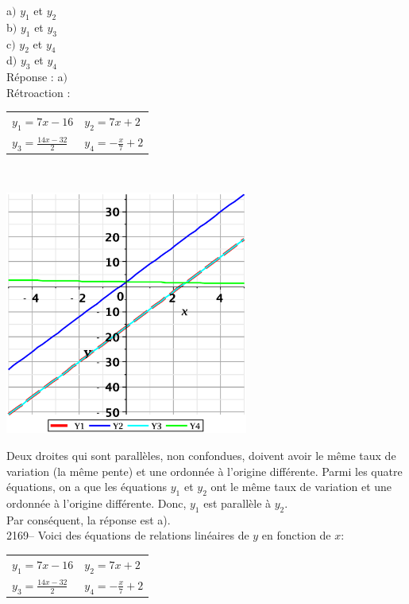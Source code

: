 \documentclass[letterpaper, 12pt]{article}
\begin{document}
a$)$ $ y_{1}$ et $ y_{2}$\\
b$)$ $ y_{1}$ et $ y_{3}$\\
c$)$ $ y_{2}$ et $ y_{4}$\\
d$)$ $ y_{3}$ et $ y_{4}$\\

R\'eponse : a$)$\\

R\'etroaction :
\begin{center}
\begin{tabular}{l l}
 $ y_{1}=7x-16 $ &  $ y_{2}=7x+2 $ \\
 $ y_{3}=\frac{14x-32}{2} $ &  $ y_{4}=-\frac{x}{7}+2 $ \\
\end{tabular}\\
\end{center}
\begin{center}
 \includegraphics[width=8cm,bb=20 118 575 673]{Q2168.eps}
\end{center}
Deux droites qui sont parall\`eles, non confondues, doivent avoir le m\^eme taux de variation (la m\^eme pente) et une ordonn\'ee \`a l'origine diff\'erente. Parmi les quatre \'equations, on a que les \'equations $ y_{1}$ et $ y_{2}$ ont le m\^eme taux de variation et une ordonn\'ee \`a l'origine diff\'erente. Donc, $ y_{1}$ est parall\`ele \`a $ y_{2}$.\\
Par cons\'equent, la r\'eponse est a).\\

2169-- Voici des \'equations de relations lin\'eaires de $y$ en fonction de $x$:
\begin{center}
\begin{tabular}{l l}
 $ y_{1}=7x-16 $ &  $ y_{2}=7x+2 $ \\
 $ y_{3}=\frac{14x-32}{2} $ &  $ y_{4}=-\frac{x}{7}+2 $ \\
\end{tabular}\\
\end{center}
\end{document}
